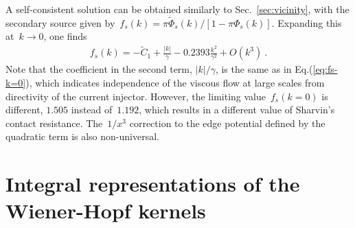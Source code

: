 \documentclass[preprint,aps,eqsecnum, prb]{revtex4-1}
\begin{document}
A self-consistent solution can be obtained similarly to
Sec.~\ref{sec:vicinity}, with the secondary source
given by~$f_s(k) = \pi \tilde{\Phi}_s(k)/[1 - \pi \Phi_s(k)]$.
Expanding this at~$k \to 0$, one finds
\begin{align}
  f_s(k) = -{\tilde C}_1 + \frac{|k|}{\gamma} - 0.2393 \frac{k^2}{\gamma^2}
  + O(k^3)\ .
\end{align}
Note that the coefficient in the second term, $|k|/\gamma$,
is the same as in Eq.(\ref{eq:fs-k=0}), which indicates independence
of the viscous flow at large scales from directivity of the current
injector. However, the limiting value~$f_s(k = 0)$ is different, 
$1.505$ instead of~$1.192$, which results in a different value of
Sharvin's contact resistance. The~$1/x^3$ correction to the
edge potential defined by the quadratic term is also non-universal. 


%


\section{Integral representations of the Wiener-Hopf kernels}
\label{sec:app-integrals}
\end{document}
